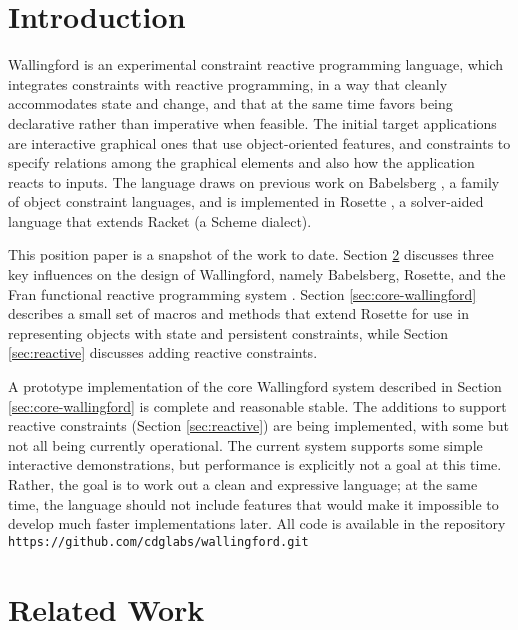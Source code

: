 \documentclass[reprint]{sigplanconf}
\begin{document}

\section{Introduction}

Wallingford is an experimental constraint reactive programming
language, which integrates constraints with reactive programming, in a
way that cleanly accommodates state and change, and that at the same
time favors being declarative rather than imperative when feasible.
The initial target applications are interactive graphical ones that
use object-oriented features, and constraints to specify relations
among the graphical elements and also how the application reacts to
inputs.  The language draws on previous work on Babelsberg
\cite{FelgentreffJOT14,felgentreff-oopsla-2015}, a family of
object constraint languages, and is implemented in Rosette
\cite{torlak-onward-2013,torlak-pldi-2014}, a
solver-aided language that extends Racket (a Scheme dialect).

This position paper is a snapshot of the work to date.  Section
\ref{sec:related-work} discusses three key influences on the design of
Wallingford, namely Babelsberg, Rosette, and the Fran
functional reactive programming system
\cite{elliot-icfp-1997}.  Section \ref{sec:core-wallingford} describes a small
set of macros and methods that extend Rosette for use in representing
objects with state and persistent constraints, while Section
\ref{sec:reactive} discusses adding reactive constraints.

A prototype implementation of the core Wallingford system described in
Section \ref{sec:core-wallingford} is complete and reasonable stable.
The additions to support reactive constraints (Section
\ref{sec:reactive}) are being implemented, with some but not all being
currently operational.  The current system supports some simple
interactive demonstrations, but performance is explicitly not a goal
at this time.  Rather, the goal is to work out a clean and expressive
language; at the same time, the language should not include features
that would make it impossible to develop much faster implementations
later.  All code is available in the repository
\verb|https://github.com/cdglabs/wallingford.git|

\section{Related Work}
\label{sec:related-work}
\end{document}
